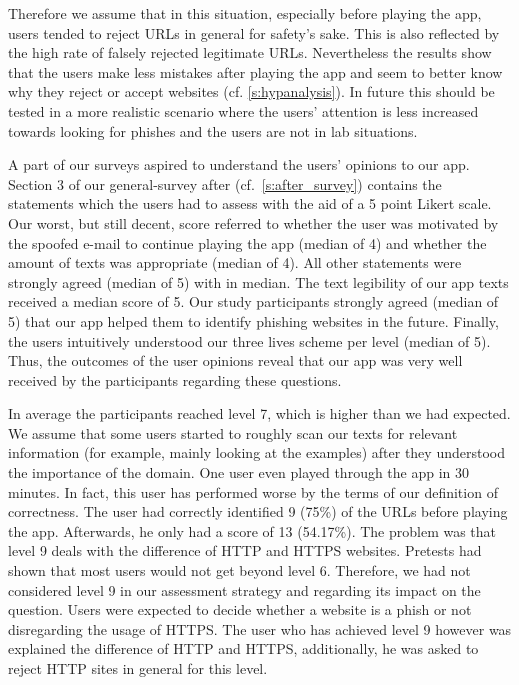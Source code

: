 \begin{description}[leftmargin=0cm]
	Therefore we assume that in this situation, especially before playing the app, users tended to reject URLs in general for safety's sake.
	This is also reflected by the high rate of falsely rejected legitimate URLs.
	Nevertheless the results show that the users make less mistakes after playing the app and seem to better know why they reject or accept websites (cf. \autoref{s:hypanalysis}).
	In future this should be tested in a more realistic scenario where the users' attention is less increased towards looking for phishes and the users are not in lab situations.
	\item[User Opinions to App:] A part of our surveys aspired to understand the users' opinions to our app.
	Section 3 of our general-survey after (cf.~\autoref{s:after_survey}) contains the statements which the users had to assess with the aid of a 5 point Likert scale.
	Our worst, but still decent, score referred to whether the user was motivated by the spoofed e-mail to continue playing the app (median of 4) and whether the amount of texts was appropriate (median of 4).
	All other statements were strongly agreed (median of 5) with in median.
	The text legibility of our app texts received a median score of 5.
	Our study participants strongly agreed (median of 5) that our app helped them to identify phishing websites in the future.
	Finally, the users intuitively understood our three lives scheme per level (median of 5).
	Thus, the outcomes of the user opinions reveal that our app was very well received by the participants regarding these questions.
	\item[Achieved Levels:] In average the participants reached level 7, which is higher than we had expected.
	We assume that some users started to roughly scan our texts for relevant information (for example, mainly looking at the examples) after they understood the importance of the domain.
	One user even played through the app in 30 minutes.
	In fact, this user has performed worse by the terms of our definition of correctness.
	The user had correctly identified 9 (75\%) of the URLs before playing the app.
	Afterwards, he only had a score of 13 (54.17\%).
	The problem was that level 9 deals with the difference of HTTP and HTTPS websites.
	Pretests had shown that most users would not get beyond level 6. Therefore, we had not considered level 9 in our assessment strategy and regarding its impact on the question.
	Users were expected to decide whether a website is a phish or not disregarding the usage of HTTPS.
	The user who has achieved level 9 however was explained the difference of HTTP and HTTPS, additionally, he was asked to reject HTTP sites in general for this level.

\end{description}
